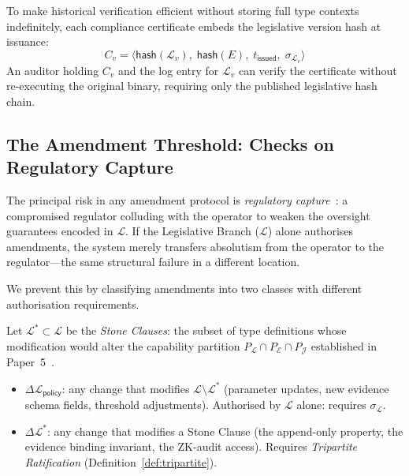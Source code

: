 \begin{remark}
\label{rem:versioned-cert}
To make historical verification efficient without storing full type
contexts indefinitely, each compliance certificate embeds the
legislative version hash at issuance:
\[
  C_{v} = \langle \mathsf{hash}(\mathcal{L}_v),\;
                   \mathsf{hash}(E),\;
                   t_{\mathsf{issued}},\;
                   \sigma_{\mathcal{L}_v} \rangle
\]
An auditor holding $C_v$ and the log entry for $\mathcal{L}_v$ can
verify the certificate without re-executing the original binary,
requiring only the published legislative hash chain.
\end{remark}

\subsection{The Amendment Threshold: Checks on Regulatory Capture}
\label{subsec:threshold}

The principal risk in any amendment protocol is \emph{regulatory
capture}~\cite{stigler1971}: a compromised regulator colluding with the
operator to weaken the oversight guarantees encoded in $\mathcal{L}$.
If the Legislative Branch ($\mathcal{L}$) alone authorises amendments,
the system merely transfers absolutism from the operator to the
regulator---the same structural failure in a different location.

We prevent this by classifying amendments into two classes with
different authorisation requirements.

\begin{definition}
\label{def:amendment-classes}
Let $\mathcal{L}^* \subset \mathcal{L}$ be the \emph{Stone Clauses}:
the subset of type definitions whose modification would alter the
capability partition $P_{\mathcal{L}} \cap P_{\mathcal{E}} \cap
P_{\mathcal{J}}$ established in Paper~5~\cite{btv-cc}.
\begin{itemize}
  \item $\Delta\mathcal{L}_{\mathsf{policy}}$: any change that modifies
  $\mathcal{L} \setminus \mathcal{L}^*$ (parameter updates, new
  evidence schema fields, threshold adjustments). Authorised by
  $\mathcal{L}$ alone: requires $\sigma_{\mathcal{L}}$.
  \item $\Delta\mathcal{L}^*$: any change that modifies a Stone
  Clause (the append-only property, the evidence binding invariant, the
  ZK-audit access). Requires \emph{Tripartite Ratification}
  (Definition~\ref{def:tripartite}).
\end{itemize}
\end{definition}

